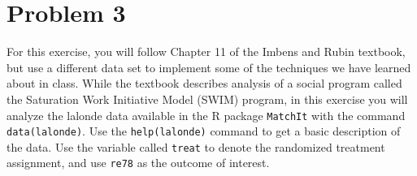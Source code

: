 
\section{Problem 3}

\begin{quoting}
  For this exercise, you will follow Chapter 11 of the Imbens and
  Rubin textbook, but use a different data set to implement some of
  the techniques we have learned about in class. While the textbook
  describes analysis of a social program called the Saturation Work
  Initiative Model (SWIM) program, in this exercise you will analyze
  the lalonde data available in the \textsf{R} package
  \texttt{MatchIt} with the command \texttt{data(lalonde)}. Use the
  \texttt{help(lalonde)} command to get a basic description of the
  data. Use the variable called \texttt{treat} to denote the
  randomized treatment assignment, and use \texttt{re78} as the
  outcome of interest.
\end{quoting}

